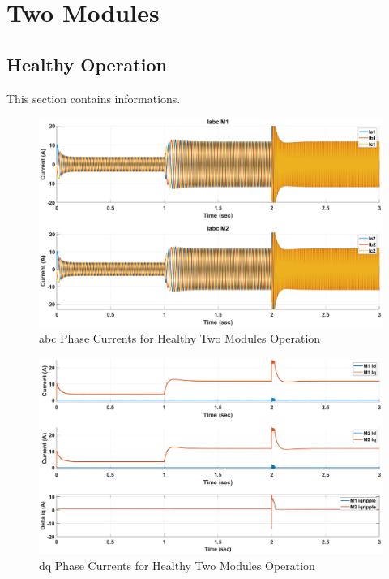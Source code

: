 \documentclass{article}
\begin{document}
\section{Two Modules}
\subsection{Healthy Operation}
This section contains informations.

\begin{figure}[h!]
\centering
\includegraphics[scale=0.35]{SimulationResults/two_modules/healthy/Iabc.eps}
\caption{abc Phase Currents for Healthy Two Modules Operation}
\label{fig:PhaseCurrentsAbcTwoModulesHealthy}
\end{figure}

\begin{figure}[h!]
\centering
\includegraphics[scale=0.35]{SimulationResults/two_modules/healthy/Idq_iqripple.eps}
\caption{dq Phase Currents for Healthy Two Modules Operation}
\label{fig:PhaseCurrentsDqTwoModulesHealthy}
\end{figure}
\end{document}
